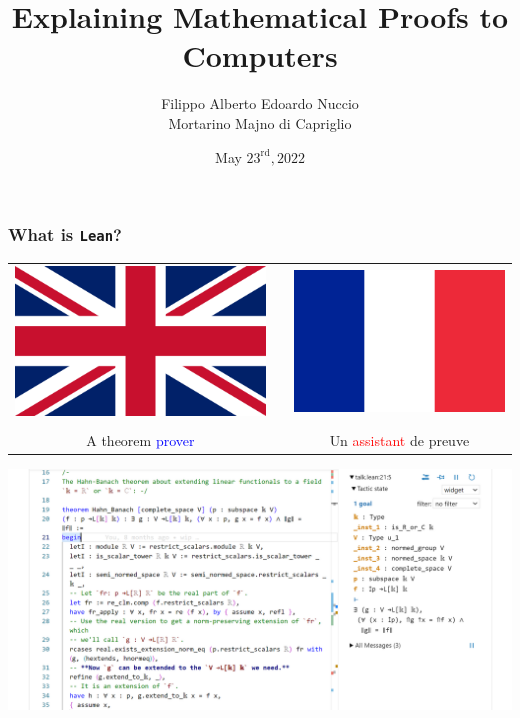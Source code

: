 \documentclass[10pt]{beamer}
\date{May $23^\text{rd}, 2022$}
\title{Explaining Mathematical Proofs to Computers}
\author[Filippo A. E. Nuccio]{Filippo Alberto Edoardo Nuccio\\ Mortarino Majno di Capriglio}
\institute[ICJ - UJM]{Institut Camille Jordan\\
Université Jean Monnet, Saint-Étienne (France)}
\begin{document}
 
\frame{\titlepage}
\begin{frame}
\frametitle{What is \texttt{Lean}?}
\setlength{\tabcolsep}{8pt}
\def\arraystretch{1.5}
\begin{tabular}{ c c c  }
\centering
\includegraphics[scale=.4]{union_jack.png}&&\includegraphics[scale=.45]{french_flag.png}\\\\
A theorem \textcolor{Blue}{prover}&&Un \textcolor{red}{assistant} de preuve\\
\end{tabular}
\end{frame}
\begin{frame}
\includegraphics[trim=2.2cm 0 0 -1cm, scale = .285]{Hahn_Banach.png}
\end{frame}
\end{document}
